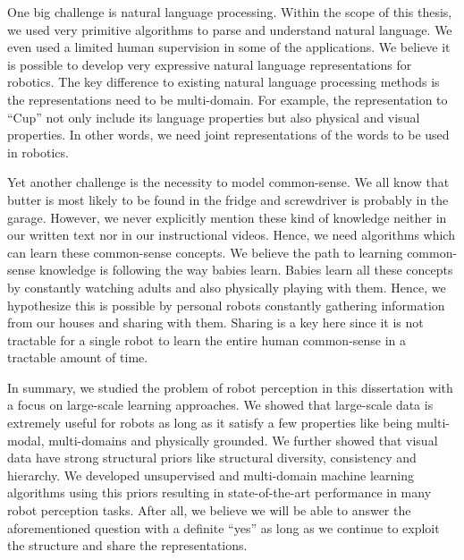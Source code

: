 One big challenge is natural language processing. Within the scope of this thesis, we used very primitive algorithms to parse and understand natural language. We even used a limited human supervision in some of the applications. We believe it is possible to develop very expressive natural language representations for robotics. The key difference to existing natural language processing methods is the representations need to be multi-domain. For example, the representation to ``Cup'' not only include its language properties but also physical and visual properties. In other words, we need joint representations of the words to be used in robotics.

Yet another challenge is the necessity to model common-sense. We all know that butter is most likely to be found in the fridge and screwdriver is probably in the garage. However, we never explicitly mention these kind of knowledge neither in our written text nor in our instructional videos. Hence, we need algorithms which can learn these common-sense concepts. We believe the path to learning common-sense knowledge is following the way babies learn. Babies learn all these concepts by constantly watching adults and also physically playing with them. Hence, we hypothesize this is possible by personal robots constantly gathering information from our houses and sharing with them. Sharing is a key here since it is not tractable for a single robot to learn the entire human common-sense in a tractable amount of time. 

In summary, we studied the problem of robot perception in this dissertation with a focus on large-scale learning approaches. We showed that large-scale data is extremely useful for robots as long as it satisfy a few properties like being multi-modal, multi-domains and physically grounded. We further showed that visual data have strong structural priors like structural diversity, consistency and hierarchy. We developed unsupervised and multi-domain machine learning algorithms using this priors resulting in state-of-the-art performance in many robot perception tasks. After all, we believe we will be able to answer the aforementioned question with a definite ``yes'' as long as we continue to exploit the structure and share the representations.

